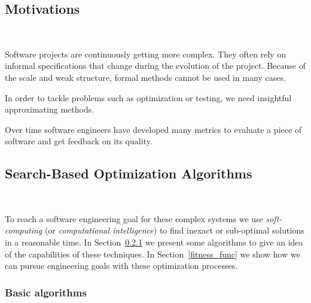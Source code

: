 \documentclass[11pt]{sdm}
\newcommand{\todo}[1]{\colorbox{Red!75}{\textcolor{white}{\textbf{TODO\ifx&#1&\else: #1\fi}}}}
\newcommand{\review}{\colorbox{YellowOrange!100}{\textcolor{white}{\textbf{REVIEW}}}}
\begin{document}
\subsection{Motivations}
\label{motiv}
\todo{}

Software projects are continuously getting more complex.
They often rely on informal specifications that change during the evolution of the project.
Because of the scale and weak structure, formal methods cannot be used in many cases.

In order to tackle problems such as optimization or testing, we need insightful approximating methods.

Over time software engineers have developed many metrics to evaluate a piece of software and get feedback on its quality.

\subsection{Search-Based Optimization Algorithms}
\label{example_algo}
\review{}

To reach a software engineering goal for these complex systems we use \textit{soft-computing} (or \textit{computational intelligence}) to find inexact or sub-optimal solutions in a reasonable time.
In Section~\ref{basic_algo} we present some algorithms to give an idea of the capabilities of these techniques.
In Section~\ref{fitness_func} we show how we can pursue engineering goals with these optimization processes.

\subsubsection{Basic algorithms}
\label{basic_algo}
\end{document}
